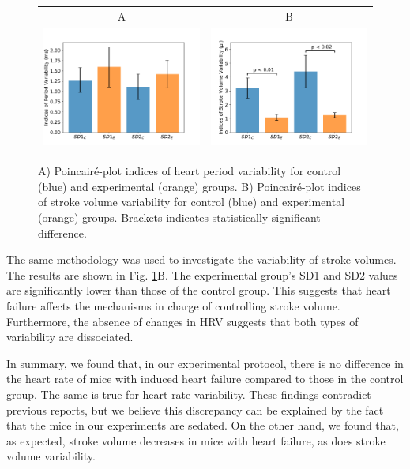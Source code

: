 \documentclass[%
preprint,
 amsmath,amssymb,
 aps,
]{revtex4-2}
\begin{document}
\begin{figure}[h!]
    \begin{tabular}{cc}
        A & B \\
        \includegraphics[width=3in]{Fig02_A.pdf} &
        \includegraphics[width=3in]{Fig02_B.pdf}
    \end{tabular}
    \caption{A) Poincairé-plot indices of heart period variability for control (blue) and experimental (orange) groups. B) Poincairé-plot indices of stroke volume variability for control (blue) and experimental (orange) groups. Brackets indicates statistically significant difference.}
    \label{fig:fig02}
\end{figure}

The same methodology was used to investigate the variability of stroke volumes. The results are shown in Fig. \ref{fig:fig02}B. The experimental group's SD1 and SD2 values are significantly lower than those of the control group. This suggests that heart failure affects the mechanisms in charge of controlling stroke volume. Furthermore, the absence of changes in HRV suggests that both types of variability are dissociated.

In summary, we found that, in our experimental protocol, there is no difference in the heart rate of mice with induced heart failure compared to those in the control group. The same is true for heart rate variability. These findings contradict previous reports, but we believe this discrepancy can be explained by the fact that the mice in our experiments are sedated. On the other hand, we found that, as expected, stroke volume decreases in mice with heart failure, as does stroke volume variability. 
\end{document}
